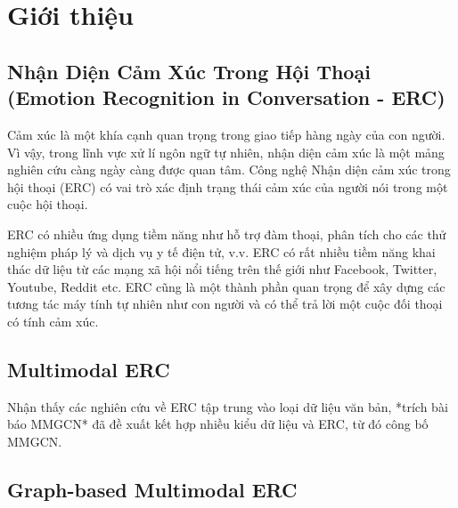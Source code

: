 \chapter{Giới thiệu}
\label{chap:Giới thiệu}



\section{Nhận Diện Cảm Xúc Trong Hội Thoại (Emotion Recognition in Conversation - ERC)}
\label{sec:Nhận Diện Cảm Xúc Trong Hội Thoại (Emotion Recognition in Conversation - ERC)}

Cảm xúc là một khía cạnh quan trọng trong giao tiếp hàng ngày của con người. 
Vì vậy, trong lĩnh vực xử lí ngôn ngữ tự nhiên, nhận diện cảm xúc là một mảng nghiên cứu càng ngày càng được quan tâm. 
Công nghệ Nhận diện cảm xúc trong hội thoại (ERC) có vai trò xác định trạng thái cảm xúc của người nói trong một cuộc hội thoại. 

ERC có nhiều ứng dụng tiềm năng như hỗ trợ đàm thoại, phân tích cho các thử nghiệm pháp lý và dịch vụ y tế điện tử, v.v.
ERC có rất nhiều tiềm năng khai thác dữ liệu từ các mạng xã hội nổi tiếng trên thế giới như Facebook, Twitter, Youtube, Reddit etc. 
ERC cũng là một thành phần quan trọng để xây dựng các tương tác máy tính tự nhiên như con người và có thể trả lời một cuộc đối thoại có tính cảm xúc.



\section{Multimodal ERC}
\label{sec:Multimodal ERC}

Nhận thấy các nghiên cứu về ERC tập trung vào loại dữ liệu văn bản, *trích bài báo MMGCN* đã đề xuất kết hợp nhiều kiểu dữ liệu và ERC, từ đó công bố MMGCN. 

\section{Graph-based Multimodal ERC}
\label{chap:Graph-based Multimodal ERC}







